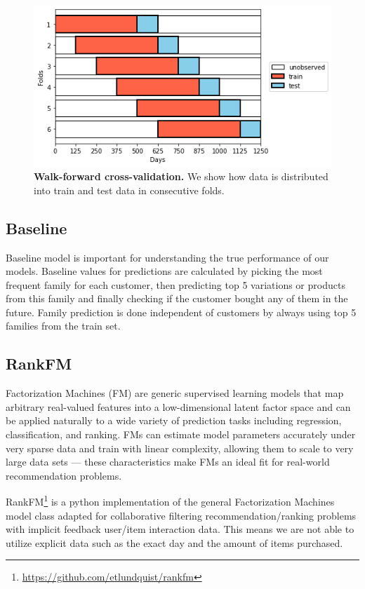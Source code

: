 \documentclass[fleqn,moreauthors,10pt]{ds_report}
\begin{document}
\begin{figure}[H]\centering
	\includegraphics[width=\linewidth]{cv.png}
	\caption{\textbf{Walk-forward cross-validation.} We show how data is distributed into train and test data in consecutive folds.}
	\label{cv}
\end{figure}

\subsection*{Baseline}
Baseline model is important for understanding the true performance of our models. Baseline values for predictions are calculated by picking the most frequent family for each customer, then predicting top 5 variations or products from this family and finally checking if the customer bought any of them in the future. Family prediction is done independent of customers by always using top 5 families from the train set.

\subsection*{RankFM}

Factorization Machines (FM) are generic supervised learning models that map arbitrary real-valued features into a low-dimensional latent factor space and can be applied naturally to a wide variety of prediction tasks including regression, classification, and ranking. FMs can estimate model parameters accurately under very sparse data and train with linear complexity, allowing them to scale to very large data sets — these characteristics make FMs an ideal fit for real-world recommendation problems. \cite{fm}

RankFM\footnote{\url{https://github.com/etlundquist/rankfm}} is a python implementation of the general Factorization Machines model class adapted for collaborative filtering recommendation/ranking problems with implicit feedback user/item interaction data. This means we are not able to utilize explicit data such as the exact day and the amount of items purchased.
\end{document}
